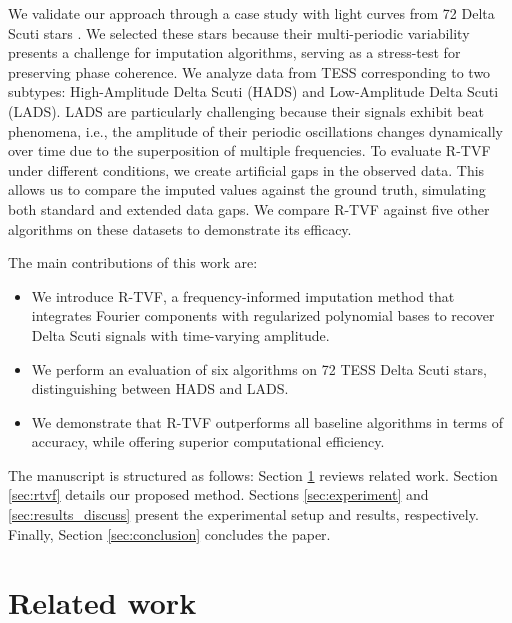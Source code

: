 \documentclass[a4paper,fleqn]{cas-sc}
\begin{document}
We validate our approach through a case study with light curves from 72 Delta Scuti stars \cite{baglin1973delta}. We selected these stars because their multi-periodic variability presents a challenge for imputation algorithms, serving as a stress-test for preserving phase coherence. We analyze data from TESS corresponding to two subtypes: High-Amplitude Delta Scuti (HADS) and Low-Amplitude Delta Scuti (LADS). LADS are particularly challenging because their signals exhibit beat phenomena, i.e., the amplitude of their periodic oscillations changes dynamically over time due to the superposition {\color{blue}of} multiple frequencies. To evaluate R-TVF under different conditions, we create artificial gaps in the observed data. This allows us to compare the imputed values against the ground truth, simulating both standard and extended data gaps. We compare R-TVF against five other algorithms on these datasets to demonstrate its efficacy.

The main contributions of this work are:

\begin{itemize}
    \item We introduce R-TVF, a frequency-informed imputation method that integrates Fourier components with regularized polynomial bases to recover Delta Scuti signals with time-varying amplitude.
    
    \item We perform an evaluation of six algorithms on 72 TESS Delta Scuti stars, distinguishing between HADS and LADS.
    
    \item We demonstrate that R-TVF outperforms all baseline algorithms in terms of accuracy, while offering superior computational efficiency.
\end{itemize}

The manuscript is structured as follows: Section \ref{sec:related_work} reviews related work. Section \ref{sec:rtvf} details our proposed method. Sections \ref{sec:experiment} and \ref{sec:results_discuss} present the experimental setup and results, respectively. Finally, Section \ref{sec:conclusion} concludes the paper.

\section{Related work} \label{sec:related_work}
\end{document}
